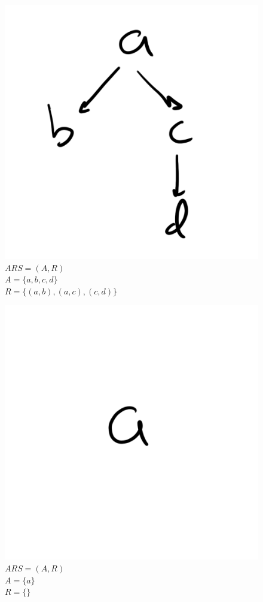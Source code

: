 \documentclass{article}
\begin{document}
\begin{figure}[H]
  \centering
  \includegraphics[scale=0.06]{gen4}
  \caption[] {
    $ARS = (A, R)$
    \\ $A=\{a, b, c, d\}$
    \\ $R=\{(a, b), (a, c), (c,d)\}$
    \endtabular}
\end{figure}

\begin{figure}[H]
  \centering
  \includegraphics[scale=0.06]{gen5}
  \caption[] {
    $ARS = (A, R)$
    \\ $A=\{a\}$
    \\ $R=\{\}$
    \endtabular}
\end{figure}
\end{document}
